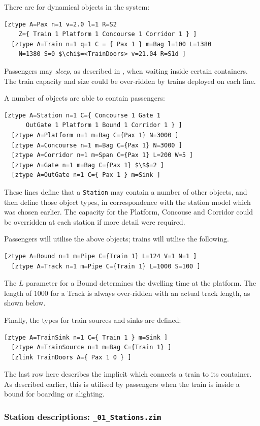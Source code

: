 There are  for dynamical objects in the system:
\begin{lstlisting}[mathescape] 
  [ztype A=Pax n=1 v=2.0 l=1 R=S2
    Z={ Train 1 Platform 1 Concourse 1 Corridor 1 } ]
  [ztype A=Train n=1 q=1 C = { Pax 1 } m=Bag l=100 L=1380
    N=1380 S=0 $\chi$=<TrainDoors> v=21.04 R=S1d ]
\end{lstlisting}
Passengers may \emph{sleep}, as described in , when waiting inside certain containers.
The train capacity and size could be over-ridden by trains deployed on each line.

A number of objects are able to contain passengers:
\begin{lstlisting}[mathescape] 
  [ztype A=Station n=1 C={ Concourse 1 Gate 1
      OutGate 1 Platform 1 Bound 1 Corridor 1 } ]
  [ztype A=Platform n=1 m=Bag C={Pax 1} N=3000 ]
  [ztype A=Concourse n=1 m=Bag C={Pax 1} N=3000 ]
  [ztype A=Corridor n=1 m=Span C={Pax 1} L=200 W=5 ]
  [ztype A=Gate n=1 m=Bag C={Pax 1} $\$$=2 ]
  [ztype A=OutGate n=1 C={ Pax 1 } m=Sink ]
\end{lstlisting}
These lines define that a {\tt Station} may contain a number of other objects, and then define those object types,
in correspondence with the station model which was chosen earlier.
The capacity for the Platform, Concouse and Corridor could be overridden at each station if more detail were required.

Passengers will utilise the above objects; trains will utilise the following.
\begin{lstlisting}[mathescape] 
  [ztype A=Bound n=1 m=Pipe C={Train 1} L=124 V=1 N=1 ]
  [ztype A=Track n=1 m=Pipe C={Train 1} L=1000 S=100 ]
\end{lstlisting}
The $L$ parameter for a Bound determines the dwelling time at the platform.
The length of $1000$ for a Track is always over-ridden with an actual track length,
as shown below.

Finally, the types for train sources and sinks are defined:
\begin{lstlisting}[mathescape] 
  [ztype A=TrainSink n=1 C={ Train 1 } m=Sink ]
  [ztype A=TrainSource n=1 m=Bag C={Train 1} ]
  [zlink TrainDoors A={ Pax 1 0 } ]
\end{lstlisting}
The last row here describes the implicit  which connects a train to its container.
As described earlier, this is utilised by passengers when the train is inside a bound 
for boarding or alighting.

\subsubsection{Station descriptions: {\tt \_01\_Stations.zim}}

